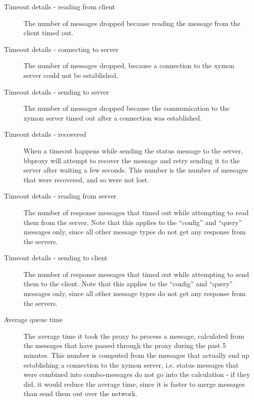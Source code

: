 \begin{description}
\item[Timeout details - reading from client] The number of messages dropped because reading the message from the client timed out. 

 

\item[Timeout details - connecting to server] The number of messages dropped, because a connection to the xymon server could not be established. 

 

\item[Timeout details - sending to server] The number of messages dropped because the communication to the xymon server timed out after a connection was established. 

 

\item[Timeout details - recovered] When a timeout happens while sending the status message to the server, bbproxy will attempt to recover the message and retry sending it to the server after waiting a few seconds. This number is the number of messages that were recovered, and so were not lost. 

 

\item[Timeout details - reading from server] The number of response messages that timed out while attempting to read them from the server. Note that this applies to the ``config'' and ``query'' messages only, since all other message types do not get any response from the servers. 

 

\item[Timeout details - sending to client] The number of response messages that timed out while attempting to send them to the client. Note that this applies to the ``config'' and ``query'' messages only, since all other message types do not get any response from the servers. 

 

\item[Average queue time] The average time it took the proxy to process a message, calculated from the messages that have passed through the proxy during the past 5 minutes. This number is computed from the messages that actually end up establishing a connection to the xymon server, i.e. status messages that were combined into combo-messages do not go into the calculation - if they did, it would reduce the average time, since it is faster to merge messages than send them out over the network. 

 


\end{description}

